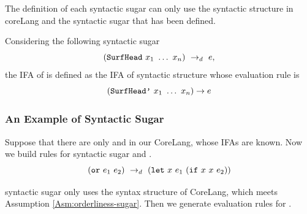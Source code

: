 \begin{Asm}
\label{Asm:orderliness-sugar}
The definition of each syntactic sugar can only use the syntactic structure in coreLang and the syntactic sugar that has been defined.
\end{Asm}

\begin{Def}
\label{def:ifa-sugar}
Considering the following syntactic sugar 
\[
(\mbox{\tt SurfHead}~x_1~\ldots~x_n) ~\rightarrow_d~ e,
\] 
the IFA of  is defined as the IFA of syntactic structure  whose evaluation rule is
\[
(\mbox{\tt SurfHead'}~x_1~\ldots~x_n) \to e
\]

\end{Def}

\subsubsection{An Example of Syntactic Sugar}

Suppose that there are only  and  in our CoreLang, whose IFAs are known. Now we build rules for syntactic sugar  and .
\[
(\mbox{\tt or}~e_1~e_2) ~\rightarrow_d~ (\mbox{\tt let}~x~e_1~(\mbox{\tt if}~x~x~e_2)) 
\]

 syntactic sugar only uses the syntax structure of CoreLang, which meets Assumption \ref{Asm:orderliness-sugar}. Then we generate evaluation rules for .

